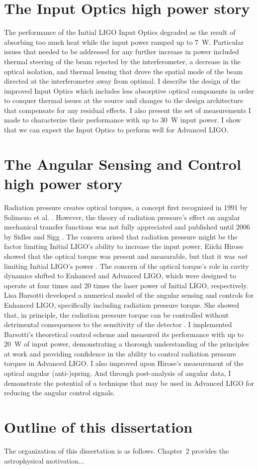 \section{The Input Optics high power story} 
The performance of the Initial LIGO Input Optics degraded as the
result of absorbing too much heat while the input power ramped up to
7~W. Particular issues that needed to be addressed for any further
increase in power included thermal steering of the beam rejected by
the interferometer, a decrease in the optical isolation, and thermal
lensing that drove the spatial mode of the beam directed at the
interferometer away from optimal. I describe the design of the
improved Input Optics which includes less absorptive optical
components in order to conquer thermal issues at the source and
changes to the design architecture that compensate for any residual
effects. I also present the set of measurements I made to characterize
their performance with up to 30~W input power. I show that we can
expect the Input Optics to perform well for Advanced LIGO.



\section{The Angular Sensing and Control high power story}
Radiation pressure creates optical torques, a concept first recognized
in 1991 by Solimeno et al. \cite{Solimeno1991FabryPerot}. However, the
theory of radiation pressure's effect on angular mechanical transfer
functions was not fully appreciated and published until 2006 by Sidles
and Sigg \cite{Sidles2006Optical}. The concern arised that radiation
pressure might be the factor limiting Initial LIGO's ability to
increase the input power. Eiichi Hirose showed that the optical torque
was present and measurable, but that it was \emph{not} limiting
Initial LIGO's power \cite{Hirose2010Angular}. The concern of the
optical torque's role in cavity dynamics shifted to Enhanced and
Advanced LIGO, which were designed to operate at four times and 20
times the laser power of Initial LIGO, respectively. Lisa Barsotti
developed a numerical model of the angular sensing and controls for
Enhanced LIGO, specifically including radiation pressure torque. She
showed that, in principle, the radiation pressure torque can be
controlled without detrimental consequences to the sensitivity of the
detector \cite{Barsotti2009Modeling}. I implemented Barsotti's
theoretical control scheme and measured its performance with up to
20~W of input power, demonstrating a thorough understanding of the
principles at work and providing confidence in the ability to control
radiation pressure torques in Advanced LIGO. I also improved upon
Hirose's measurement of the optical angular (anti-)spring. And through
post-analysis of angular data, I demonstrate the potential of a
technique that may be used in Advanced LIGO for reducing the angular
control signals.



\section{Outline of this dissertation}
The organization of this
dissertation is as follows. Chapter~2 provides the astrophysical
motivation...
